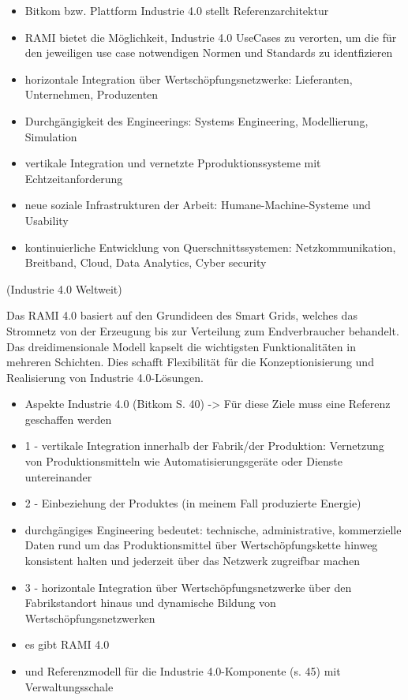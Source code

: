 \begin{itemize}
  \item Bitkom bzw. Plattform Industrie 4.0 stellt Referenzarchitektur
  \item RAMI bietet die Möglichkeit, Industrie 4.0 UseCases zu verorten, um die für den jeweiligen use case notwendigen Normen und Standards zu identfizieren
  \item horizontale Integration über Wertschöpfungsnetzwerke: Lieferanten, Unternehmen, Produzenten
  \item Durchgängigkeit des Engineerings: Systems Engineering, Modellierung, Simulation
  \item vertikale Integration und vernetzte Pproduktionssysteme mit Echtzeitanforderung
  \item neue soziale Infrastrukturen der Arbeit: Humane-Machine-Systeme und Usability
  \item kontinuierliche Entwicklung von Querschnittssystemen: Netzkommunikation, Breitband, Cloud, Data Analytics, Cyber security
\end{itemize}

(Industrie 4.0 Weltweit)

Das RAMI 4.0 basiert auf den Grundideen des Smart Grids, welches das Stromnetz von der Erzeugung bis zur Verteilung zum Endverbraucher behandelt. Das dreidimensionale Modell kapselt die wichtigsten Funktionalitäten in mehreren Schichten. Dies schafft Flexibilität für die Konzeptionisierung und Realisierung von Industrie 4.0-Lösungen.

\begin{itemize}
  \item Aspekte Industrie 4.0 (Bitkom S. 40) -> Für diese Ziele muss eine Referenz geschaffen werden
  \item 1 - vertikale Integration innerhalb der Fabrik/der Produktion: Vernetzung von Produktionsmitteln wie Automatisierungsgeräte oder Dienste untereinander
  \item 2 - Einbeziehung der Produktes (in meinem Fall produzierte Energie)
  \item durchgängiges Engineering bedeutet: technische, administrative, kommerzielle Daten rund um das Produktionsmittel über Wertschöpfungskette hinweg konsistent halten und jederzeit über das Netzwerk zugreifbar machen
  \item 3 - horizontale Integration über Wertschöpfungsnetzwerke über den Fabrikstandort hinaus und dynamische Bildung von Wertschöpfungsnetzwerken
  \item es gibt RAMI 4.0
  \item und Referenzmodell für die Industrie 4.0-Komponente (s. 45) mit Verwaltungsschale
\end{itemize}


